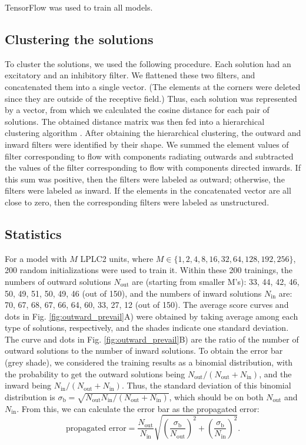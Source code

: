\documentclass[9pt,lineno]{elife}
\begin{document}
TensorFlow \citep{abadi2016tensorflow} was used to train all models.

\subsection{Clustering the solutions}
To cluster the solutions, we used the following procedure. Each solution had an excitatory and an inhibitory filter. We flattened these two filters, and concatenated them into a single vector. (The elements at the corners were deleted since they are outside of the receptive field.) Thus, each solution was represented by a vector, from which we calculated the cosine distance for each pair of solutions. The obtained distance matrix was then fed into a hierarchical clustering algorithm \citep{2020SciPy-NMeth}. After obtaining the hierarchical clustering, the outward and inward filters were identified by their shape. We summed the element values of filter corresponding to flow with components radiating outwards and subtracted the values of the filter corresponding to flow with components directed inwards. If this sum was positive, then the filters were labeled as outward; otherwise, the filters were labeled as inward. If the elements in the concatenated vector are all close to zero, then the corresponding filters were labeled as unstructured.

\subsection{Statistics}
For a model with $M$ LPLC2 units, where $M \in \{1,2,4,8,16,32,64,128,192,256\}$, 200 random initializations were used to train it. Within these 200 trainings, the numbers of outward solutions $N_{\text{out}}$ are (starting from smaller M's): 33, 44, 42, 46, 50, 49, 51, 50, 49, 46 (out of 150), and the numbers of inward solutions $N_{\text{in}}$ are: 70, 67, 68, 67, 66, 64, 60, 33, 27, 12 (out of 150). The average score curves and dots in Fig. \ref{fig:outward_prevail}A) were obtained by taking average among each type of solutions, respectively, and the shades indicate one standard deviation. The curve and dots in Fig. \ref{fig:outward_prevail}B) are the ratio of the number of outward solutions to the number of inward solutions. To obtain the error bar (grey shade), we considered the training results as a binomial distribution, with the probability to get the outward solutions being $N_{\text{out}}/(N_{\text{out}}+N_{\text{in}})$, and the inward being $N_{\text{in}}/(N_{\text{out}}+N_{\text{in}})$. Thus, the standard deviation of this binomial distribution is $\sigma_{\text{b}}=\sqrt{N_{\text{out}}N_{\text{in}}/(N_{\text{out}}+N_{\text{in}})}$, which should be on both $N_{\text{out}}$ and $N_{\text{in}}$. From this, we can calculate the error bar as the propagated error:
\begin{equation}
\text{propagated error} = \frac{N_{\text{out}}}{N_{\text{in}}}\sqrt{\left(\frac{\sigma_{\text{b}}}{N_{\text{out}}}\right)^{2}+\left(\frac{\sigma_{\text{b}}}{N_{\text{in}}}\right)^{2}}.
\end{equation}
\end{document}
